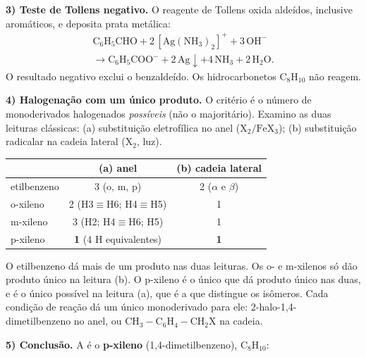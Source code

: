 \documentclass{article}%
\begin{document}
\textbf{3) Teste de Tollens negativo.}
O reagente de Tollens oxida aldeídos, inclusive aromáticos, e deposita prata metálica:
\begin{multline*}
\mathrm{C_6H_5CHO + 2\,[Ag(NH_3)_2]^+ + 3\,OH^-}\\
\mathrm{\longrightarrow C_6H_5COO^- + 2\,Ag\!\downarrow + 4\,NH_3 + 2\,H_2O}.
\end{multline*}
O resultado negativo exclui o benzaldeído. Os hidrocarbonetos $\mathrm{C_8H_{10}}$ não reagem.

\textbf{4) Halogenação com um único produto.}
O critério é o número de monoderivados halogenados \emph{possíveis} (não o majoritário). Examino as duas leituras clássicas: (a) substituição eletrofílica no anel ($\mathrm{X_2/FeX_3}$); (b) substituição radicalar na cadeia lateral ($\mathrm{X_2}$, luz).
\begin{center}
\begin{tabular}{lcc}
 & (a) anel & (b) cadeia lateral \\ \hline
etilbenzeno & 3 (o, m, p) & 2 ($\alpha$ e $\beta$) \\
o-xileno & 2 (H3$\equiv$H6; H4$\equiv$H5) & 1 \\
m-xileno & 3 (H2; H4$\equiv$H6; H5) & 1 \\
p-xileno & \textbf{1} (4 H equivalentes) & \textbf{1} \\
\end{tabular}
\end{center}
O etilbenzeno dá mais de um produto nas duas leituras. Os o- e m-xilenos só dão produto único na leitura (b). O p-xileno é o único que dá produto único nas duas, e é o único possível na leitura (a), que é a que distingue os isômeros. Cada condição de reação dá um único monoderivado para ele: 2-halo-1,4-dimetilbenzeno no anel, ou $\mathrm{CH_3\!-\!C_6H_4\!-\!CH_2X}$ na cadeia.

\textbf{5) Conclusão.}
A é o \textbf{p-xileno} (1,4-dimetilbenzeno), $\mathrm{C_8H_{10}}$:

\begin{center}
\end{center}
\end{document}
